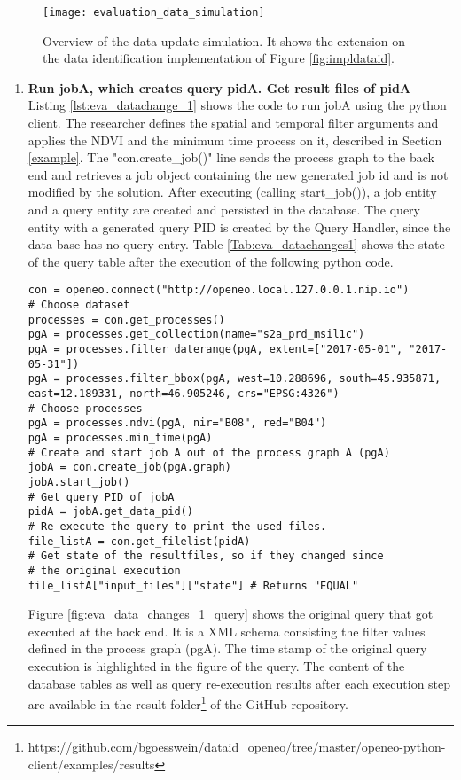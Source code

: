 \documentclass[draft,final]{vutinfth} %
\newenvironment{code}{\captionsetup{type=listing}}{}
\begin{document}
\begin{figure}[h]
	\centering
	\texttt{[image: evaluation\_data\_simulation]}
	\caption{Overview of the data update simulation. It shows the extension on the data identification implementation of Figure \ref{fig:impldataid}.}
	\label{fig:eva_data_simulation} %
\end{figure}

\begin{enumerate}
	\item \textbf{Run jobA, which creates query pidA. Get result files of pidA} \\
	Listing \ref{lst:eva_datachange_1} shows the code to run jobA using the python client. The researcher defines the spatial and temporal filter arguments and applies the NDVI and the minimum time process on it, described in Section \ref{example}. The "con.create\_job()" line sends the process graph to the back end and retrieves a job object containing the new generated job id and is not modified by the solution. After executing (calling start\_job()), a job entity and a query entity are created and persisted in the database. The query entity with a generated query PID is created by the Query Handler, since the data base has no query entry. Table \ref{Tab:eva_datachanges1} shows the state of the query table after the execution of the following python code.
	\begin{code}
		\begin{verbatim}
con = openeo.connect("http://openeo.local.127.0.0.1.nip.io")
# Choose dataset
processes = con.get_processes()
pgA = processes.get_collection(name="s2a_prd_msil1c")
pgA = processes.filter_daterange(pgA, extent=["2017-05-01", "2017-05-31"])
pgA = processes.filter_bbox(pgA, west=10.288696, south=45.935871, 
east=12.189331, north=46.905246, crs="EPSG:4326")
# Choose processes
pgA = processes.ndvi(pgA, nir="B08", red="B04")
pgA = processes.min_time(pgA)
# Create and start job A out of the process graph A (pgA)
jobA = con.create_job(pgA.graph)
jobA.start_job()
# Get query PID of jobA
pidA = jobA.get_data_pid()
# Re-execute the query to print the used files.
file_listA = con.get_filelist(pidA)
# Get state of the resultfiles, so if they changed since 
# the original execution 
file_listA["input_files"]["state"] # Returns "EQUAL"
		\end{verbatim}
		\caption{Researcher runs jobA and retrieves the result files status.}
		\label{lst:eva_datachange_1}
	\end{code}
	Figure \ref{fig:eva_data_changes_1_query} shows the original query that got executed at the back end. It is a XML schema consisting the filter values defined in the process graph (pgA). The time stamp of the original query execution is highlighted in the figure of the query. The content of the database tables as well as query re-execution results after each execution step are available in the result folder\footnote{https://github.com/bgoesswein/dataid\_openeo/tree/master/openeo-python-client/examples/results} of the GitHub repository. 
	

\end{enumerate}
\end{document}
